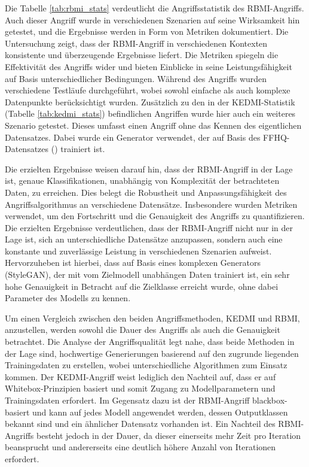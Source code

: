 Die Tabelle \ref{tab:rbmi_stats} verdeutlicht die Angriffsstatistik des \glqq RBMI\grqq-Angriffs. Auch dieser Angriff wurde in verschiedenen Szenarien auf seine Wirksamkeit hin getestet, und die Ergebnisse werden in Form von Metriken dokumentiert. Die Untersuchung zeigt, dass der \glqq RBMI\grqq-Angriff in verschiedenen Kontexten konsistente und überzeugende Ergebnisse liefert. Die Metriken spiegeln die Effektivität des Angriffs wider und bieten Einblicke in seine Leistungsfähigkeit auf Basis unterschiedlicher Bedingungen. Während des Angriffs wurden verschiedene Testläufe durchgeführt, wobei sowohl einfache als auch komplexe Datenpunkte berücksichtigt wurden. Zusätzlich zu den in der \glqq KEDMI\grqq-Statistik (Tabelle \ref{tab:kedmi_stats}) befindlichen Angriffen wurde hier auch ein weiteres Szenario getestet. Dieses umfasst einen Angriff ohne das Kennen des eigentlichen Datensatzes. Dabei wurde ein Generator verwendet, der auf Basis des FFHQ-Datensatzes (\cite{noauthor_nvlabsffhq-dataset_2023})  trainiert ist. 

Die erzielten Ergebnisse weisen darauf hin, dass der \glqq RBMI\grqq-Angriff in der Lage ist, genaue Klassifikationen, unabhängig von Komplexität der betrachteten Daten, zu erreichen. Dies belegt die Robustheit und Anpassungsfähigkeit des Angriffsalgorithmus an verschiedene Datensätze. Insbesondere wurden Metriken verwendet, um den Fortschritt und die Genauigkeit des Angriffs zu quantifizieren. Die erzielten Ergebnisse verdeutlichen, dass der \glqq RBMI\grqq-Angriff nicht nur in der Lage ist, sich an unterschiedliche Datensätze anzupassen, sondern auch eine konstante und zuverlässige Leistung in verschiedenen Szenarien aufweist. Hervorzuheben ist hierbei, dass auf Basis eines komplexen Generators (StyleGAN), der mit vom Zielmodell unabhängen Daten trainiert ist, ein sehr hohe Genauigkeit in Betracht auf die Zielklasse erreicht wurde, ohne dabei Parameter des Modells zu kennen.

Um einen Vergleich zwischen den beiden Angriffsmethoden, KEDMI und RBMI, anzustellen, werden sowohl die Dauer des Angriffs als auch die Genauigkeit betrachtet. Die Analyse der Angriffsqualität legt nahe, dass beide Methoden in der Lage sind, hochwertige Generierungen basierend auf den zugrunde liegenden Trainingsdaten zu erstellen, wobei unterschiedliche Algorithmen zum Einsatz kommen. Der KEDMI-Angriff weist lediglich den Nachteil auf, dass er auf Whitebox-Prinzipien basiert und somit Zugang zu Modellparametern und Trainingsdaten erfordert. Im Gegensatz dazu ist der RBMI-Angriff blackbox-basiert und kann auf jedes Modell angewendet werden, dessen Outputklassen bekannt sind und ein ähnlicher Datensatz vorhanden ist. Ein Nachteil des RBMI-Angriffs besteht jedoch in der Dauer, da dieser einerseits mehr Zeit pro Iteration beansprucht und andererseits eine deutlich höhere Anzahl von Iterationen erfordert.


